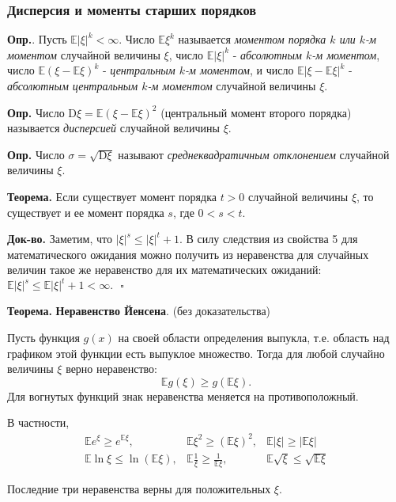\documentclass[oneside,final,14pt]{extreport}
\newcommand\mydef{{\bf Опр.}}
\newcommand\myth{{\bf Теорема.}}
\newcommand\myqed{{\bf Док-во.}}
\theoremstyle{definition}
\begin{document}
\subsubsection{Дисперсия и моменты старших порядков}

\mydef{}. Пусть $\mathbb{E}|\xi|^k < \infty.$ Число $\mathbb{E}\xi^k$ называется {\it моментом порядка $k$ или $k$-м моментом} случайной величины $\xi$, число $\mathbb{E}|\xi|^k$ - {\it абсолютным $k$-м моментом}, число $\mathbb{E}(\xi - \mathbb{E}\xi)^k$ - {\it центральным $k$-м моментом}, и число $\mathbb{E}|\xi - \mathbb{E}\xi|^k$ - {\it абсолютным центральным $k$-м моментом} случайной величины $\xi$. 

\mydef{} Число $\mathrm{D}\xi = \mathbb{E}(\xi - \mathbb{E}\xi)^2$ (центральный момент второго порядка) называется {\it дисперсией} случайной величины $\xi$.

\mydef{} Число $\sigma = \sqrt{\mathrm{D}\xi}$ называют {\it среднеквадратичным отклонением} случайной величины $\xi$.

\myth{} Если существует момент порядка $t > 0$ случайной величины $\xi$, то существует и ее момент порядка $s$, где $0 < s < t$.

\myqed{} Заметим, что $|\xi|^s \leqslant |\xi|^t + 1.$ В силу следствия из свойства 5 для математического ожидания можно получить из неравенства для случайных величин такое же неравенство для их математических ожиданий: $\mathbb{E}|\xi|^s \leqslant \mathbb{E}|\xi|^t + 1 < \infty. ~~~ \square$

\myth{} \textbf{Неравенство Йенсена}. (без доказательства)

Пусть функция $g(x)$ на своей области определения выпукла, т.е. область над графиком этой функции есть выпуклое множество. Тогда для любой случайно величины $\xi$ верно неравенство: 
$$\mathbb{E}g(\xi) \geq g(\mathbb{E}\xi).$$
Для вогнутых функций знак неравенства меняется на противоположный.

В частности,
$$\begin{array}{ccc}
\mathbb{E} e^{\xi} \geqslant e^{\mathbb{E} \xi}, & \mathbb{E} \xi^{2} \geqslant(\mathbb{E} \xi)^{2}, & \mathbb{E}|\xi| \geqslant|\mathbb{E} \xi| \\
\mathbb{E} \ln \xi \leqslant \ln (\mathbb{E} \xi), & \mathbb{E} \frac{1}{\xi} \geqslant \frac{1}{\mathbb{E} \xi}, & \mathbb{E} \sqrt{\xi} \leqslant \sqrt{\mathbb{E} \xi}
\end{array}$$

Последние три неравенства верны для положительных $\xi$.
\end{document}
